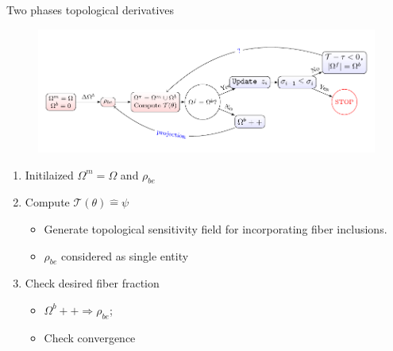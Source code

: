 \documentclass{beamer}
\newcommand{\circumeq}{\mathrel{\widehat{=}}}
\begin{document}
\begin{frame}{Two phases topological derivatives}
    \begin{figure}[!ht]
        \centering
        \includegraphics[width=1\textwidth]{./Schematics/treenodes.pdf}
        \label{fig:treenode}
    \end{figure}
    \begin{enumerate}
        \item Initilaized $\Omega^{m}=\Omega$ and $\rho_{be}$
        \item Compute $\mathcal{T}(\theta)\circumeq \psi$
              \begin{itemize}
                  \item Generate topological sensitivity field for incorporating fiber inclusions.
                  \item $\rho_{be}$ considered as single entity
              \end{itemize}
        \item Check desired fiber fraction
              \begin{itemize}
                  \item $\Omega^{b}++ \Rightarrow \rho_{be}$;
                  \item Check convergence
              \end{itemize}
    \end{enumerate}
\end{frame}

\begin{frame}

\end{frame}
\end{document}
